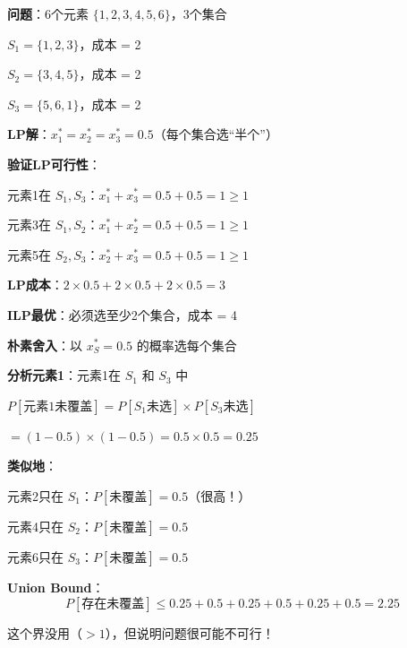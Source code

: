 \documentclass[12pt, a4paper]{ctexart}
\begin{document}
\begin{blackboard}

\textbf{问题}：6个元素 $\{1,2,3,4,5,6\}$，3个集合

$S_1 = \{1, 2, 3\}$，成本 = 2

$S_2 = \{3, 4, 5\}$，成本 = 2

$S_3 = \{5, 6, 1\}$，成本 = 2

\textbf{LP解}：$x_1^* = x_2^* = x_3^* = 0.5$（每个集合选``半个''）

\textbf{验证LP可行性}：

元素1在 $S_1, S_3$：$x_1^* + x_3^* = 0.5 + 0.5 = 1 \geq 1$ \checkmark

元素3在 $S_1, S_2$：$x_1^* + x_2^* = 0.5 + 0.5 = 1 \geq 1$ \checkmark

元素5在 $S_2, S_3$：$x_2^* + x_3^* = 0.5 + 0.5 = 1 \geq 1$ \checkmark

\textbf{LP成本}：$2 \times 0.5 + 2 \times 0.5 + 2 \times 0.5 = 3$

\textbf{ILP最优}：必须选至少2个集合，成本 = 4

\end{blackboard}

\begin{blackboard}

\textbf{朴素舍入}：以 $x_S^* = 0.5$ 的概率选每个集合

\textbf{分析元素1}：元素1在 $S_1$ 和 $S_3$ 中

$P[\text{元素1未覆盖}] = P[S_1 \text{未选}] \times P[S_3 \text{未选}]$

$= (1 - 0.5) \times (1 - 0.5) = 0.5 \times 0.5 = \mathbf{0.25}$

\textbf{类似地}：

元素2只在 $S_1$：$P[\text{未覆盖}] = 0.5$（很高！）

元素4只在 $S_2$：$P[\text{未覆盖}] = 0.5$

元素6只在 $S_3$：$P[\text{未覆盖}] = 0.5$

\textbf{Union Bound}：
\[
P[\text{存在未覆盖}] \leq 0.25 + 0.5 + 0.25 + 0.5 + 0.25 + 0.5 = \mathbf{2.25}
\]

这个界没用（$> 1$），但说明问题很可能不可行！

\end{blackboard}
\end{document}
